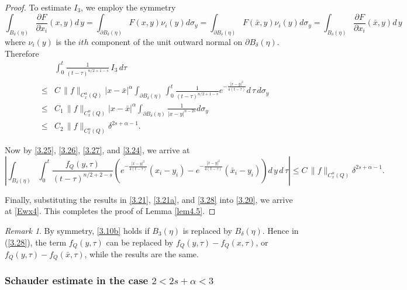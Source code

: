 \documentclass[12pt]{article}
\theoremstyle{remark}
\newtheorem{remark}[definition]{Remark}
\numberwithin{equation}{section}
\begin{document}
\begin{proof}
To estimate $I_3$, we employ the symmetry
$$ \int_{B_\delta (\eta)} \frac{\partial F}{\partial x_i} (x,y) d \, y = \int_{\partial B_\delta (\eta)} F (x,y) \nu_i (y)  d \sigma_y
= \int_{\partial B_\delta (\eta)} F (\bar{x},y) \nu_i (y)  d \sigma_y =  \int_{B_\delta (\eta)} \frac{\partial F}{\partial x_i} (\bar{x},y) d \, y$$
where $\nu_i(y)$ is the $ith$ component of the unit outward normal on $\partial B_\delta (\eta)$. Therefore
\begin{eqnarray}
& & \int_0^t \frac{1}{(t-\tau)^{n/2+1-s}} \, I_3 \, d \tau  \nonumber \\
& \leq & C \, \|f\|_{C_x^\alpha (Q)} |x-\bar{x}|^\alpha \int_{\partial B_\delta (\eta)} \int_0^t \frac{1}{(t-\tau)^{n/2+1-s}} e^{-\frac{|x-y|^2}{4(t-\tau)}} d \, \tau \, d \sigma_y \nonumber \\
& \leq & C_1 \, \|f\|_{C_x^\alpha (Q)} |x-\bar{x}|^\alpha \int_{\partial B_\delta (\eta)} \frac{1}{|x-y|^{n-2s}} d \sigma_y \nonumber \\
& \leq & C_2 \, \|f\|_{C_x^\alpha (Q)} \delta^{2s+\alpha-1}.
\label{3.27}
\end{eqnarray}

Now by \eqref{3.25}, \eqref{3.26}, \eqref{3.27}, and \eqref{3.24}, we arrive at
\begin{equation} \label{3.28}
\left| \int_{B_\delta(\eta)} \int_0^t \frac{  f_Q (y,\tau) }{(t-\tau)^{n/2+2-s}}  \left(  e^{- \frac{|x-y|^2}{4(t-\tau)}} (x_i-y_i) -
e^{- \frac{|\bar{x}-y|^2}{4(t-\tau)}} (\bar{x}_i-y_i)\right) d \, y \, d \, \tau \right| \leq C \, \|f\|_{C_x^\alpha (Q)} \delta^{2s+\alpha-1}.
\end{equation}

Finally, substituting the results in \eqref{3.21}, \eqref{3.21a}, and \eqref{3.28} into  \eqref{3.20}, we arrive at \eqref{Ewx4}.
This completes the proof of Lemma \ref{lem4.5}. \end{proof}
\medskip

\begin{remark}
By symmetry, \eqref{3.10b} holds if $B_3(\eta)$ is replaced by $B_\delta(\eta)$. Hence in (\ref{3.28}), the term $f_Q(y,\tau)$ can be replaced by $f_Q(y,\tau) - f_Q(x,\tau)$, or $f_Q(y,\tau) - f_Q(\bar{x},\tau)$, while the results are the same.
\end{remark}

\subsubsection{Schauder estimate in the case $2 < 2s + \alpha < 3$}
\end{document}
